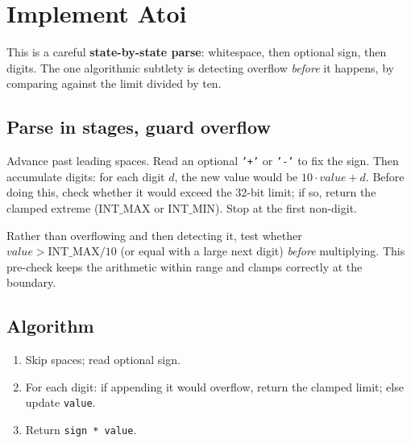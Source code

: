 \section{Implement Atoi}
\label{sec:str-atoi}


\begin{patternbox}
This is a careful \textbf{state-by-state parse}: whitespace, then optional
sign, then digits. The one algorithmic subtlety is detecting overflow
\emph{before} it happens, by comparing against the limit divided by ten.
\end{patternbox}

\subsection*{Parse in stages, guard overflow}

Advance past leading spaces. Read an optional \texttt{'+'} or \texttt{'-'}
to fix the sign. Then accumulate digits: for each digit $d$, the new value
would be $10\cdot\textit{value}+d$. Before doing this, check whether it
would exceed the 32-bit limit; if so, return the clamped extreme
($\text{INT\_MAX}$ or $\text{INT\_MIN}$). Stop at the first non-digit.

\begin{ideabox}
Rather than overflowing and then detecting it, test whether
$\textit{value} > \text{INT\_MAX}/10$ (or equal with a large next digit)
\emph{before} multiplying. This pre-check keeps the arithmetic within range
and clamps correctly at the boundary.
\end{ideabox}

\subsection*{Algorithm}

\begin{enumerate}
  \item Skip spaces; read optional sign.
  \item For each digit: if appending it would overflow, return the clamped
        limit; else update \texttt{value}.
  \item Return \texttt{sign * value}.
\end{enumerate}

